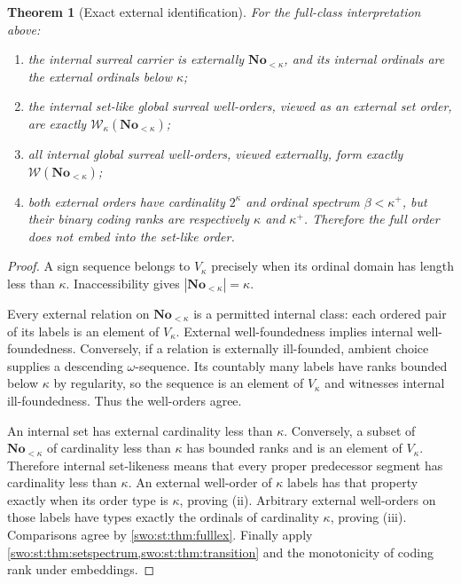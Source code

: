 \documentclass[11pt]{article}
\newtheorem{theorem}{Theorem}[section]
\theoremstyle{definition}
\theoremstyle{remark}
\newcommand{\No}{\mathbf{No}}
\newcommand{\WO}{\mathcal W}
\begin{document}
\begin{theorem}[Exact external identification]\label{swo:st:thm:model}
For the full-class interpretation above:
\begin{enumerate}[label=(\roman*)]
\item the internal surreal carrier is externally $\No_{<\kappa}$, and its
internal ordinals are the external ordinals below $\kappa$;
\item the internal set-like global surreal well-orders, viewed as an
external set order, are exactly $\WO_\kappa(\No_{<\kappa})$;
\item all internal global surreal well-orders, viewed externally, form
exactly $\WO(\No_{<\kappa})$;
\item both external orders have cardinality $2^\kappa$ and ordinal
spectrum $\beta<\kappa^+$, but their binary coding ranks are respectively
$\kappa$ and $\kappa^+$. Therefore the full order does not embed into the
set-like order.
\end{enumerate}
\end{theorem}
\begin{proof}
A sign sequence belongs to $V_\kappa$ precisely when its ordinal domain
has length less than $\kappa$. Inaccessibility gives
$|\No_{<\kappa}|=\kappa$.

Every external relation on $\No_{<\kappa}$ is a permitted internal class:
each ordered pair of its labels is an element of $V_\kappa$. External
well-foundedness implies internal well-foundedness. Conversely, if a
relation is externally ill-founded, ambient choice supplies a descending
$\omega$-sequence. Its countably many labels have ranks bounded below
$\kappa$ by regularity, so the sequence is an element of $V_\kappa$ and
witnesses internal ill-foundedness. Thus the well-orders agree.

An internal set has external cardinality less than $\kappa$.
Conversely, a subset of $\No_{<\kappa}$ of cardinality less than $\kappa$ has
bounded ranks and is an element of $V_\kappa$. Therefore internal
set-likeness means that every proper predecessor segment has cardinality
less than $\kappa$. An external well-order of $\kappa$ labels has that
property exactly when its order type is $\kappa$, proving (ii).
Arbitrary external well-orders on those labels have types exactly the
ordinals of cardinality $\kappa$, proving (iii). Comparisons agree by
\cref{swo:st:thm:fulllex}. Finally apply
\cref{swo:st:thm:setspectrum,swo:st:thm:transition} and the monotonicity of coding rank
under embeddings.
\end{proof}
\end{document}
